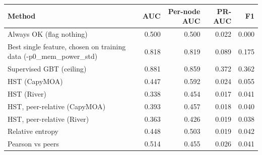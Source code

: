 \begin{tabular}{lrrrr}
\toprule
Method & AUC & Per-node AUC & PR-AUC & F1 \\
\midrule
Always OK (flag nothing) & 0.500 & 0.500 & 0.022 & 0.000 \\
Best single feature, chosen on training data (-p0\_mem\_power\_std) & 0.818 & 0.819 & 0.089 & 0.175 \\
Supervised GBT (ceiling) & 0.881 & 0.859 & 0.372 & 0.362 \\
\midrule
HST (CapyMOA) & 0.447 & 0.592 & 0.024 & 0.055 \\
HST (River) & 0.338 & 0.454 & 0.017 & 0.041 \\
HST, peer-relative (CapyMOA) & 0.393 & 0.457 & 0.018 & 0.040 \\
HST, peer-relative (River) & 0.363 & 0.426 & 0.019 & 0.038 \\
Relative entropy & 0.448 & 0.503 & 0.019 & 0.042 \\
Pearson vs peers & 0.514 & 0.455 & 0.026 & 0.041 \\
\bottomrule
\end{tabular}
